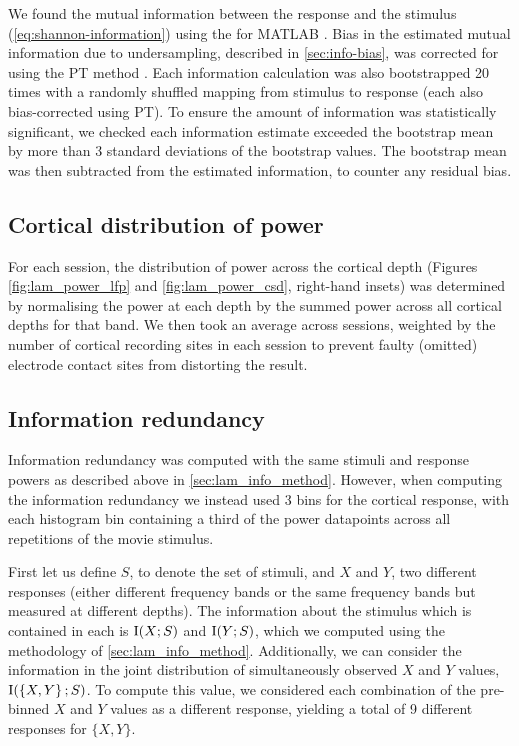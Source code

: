 We found the mutual information between the response and the stimulus (\autoref{eq:shannon-information}) using the  for MATLAB \citep{Magri2009}.
Bias in the estimated mutual information due to undersampling, described in \autoref{sec:info-bias}, was corrected for using the \ac{PT} method \citep{Treves1995}.
Each information calculation was also bootstrapped \num{20} times with a randomly shuffled mapping from stimulus to response (each also bias-corrected using \ac{PT}).
To ensure the amount of information was statistically significant, we checked each information estimate exceeded the bootstrap mean by more than \num{3} standard deviations of the bootstrap values.
The bootstrap mean was then subtracted from the estimated information, to counter any residual bias.


\subsection{Cortical distribution of power}

For each session, the distribution of power across the cortical depth (Figures \ref{fig:lam_power_lfp} and \ref{fig:lam_power_csd}, right-hand insets) was determined by normalising the power at each depth by the summed power across all cortical depths for that band.
We then took an average across sessions, weighted by the number of cortical recording sites in each session to prevent faulty (omitted) electrode contact sites from distorting the result.


\subsection{Information redundancy}
\label{sec:lam_redundancy_method}

Information redundancy was computed with the same stimuli and response powers as described above in \autoref{sec:lam_info_method}.
However, when computing the information redundancy we instead used \num{3} bins for the cortical response, with each histogram bin containing a third of the power datapoints across all repetitions of the movie stimulus.

First let us define $S$, to denote the set of stimuli, and $X$ and $Y$, two different responses (either different frequency bands or the same frequency bands but measured at different depths).
The information about the stimulus which is contained in each is $\operatorname{I}(X;S)$ and $\operatorname{I}(Y;S)$, which we computed using the methodology of \autoref{sec:lam_info_method}.
Additionally, we can consider the information in the joint distribution of simultaneously observed $X$ and $Y$ values, $\operatorname{I}(\left\{X,Y\right\};S)$.
To compute this value, we considered each combination of the pre-binned $X$ and $Y$ values as a different response, yielding a total of \num{9} different responses for $\{X,Y\}$.

